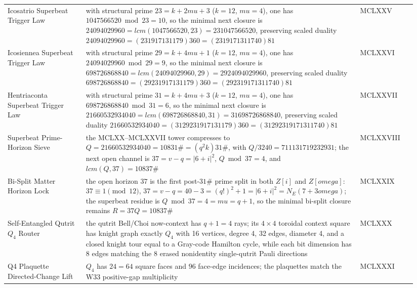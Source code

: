 \documentclass[11pt]{article}
\def\mathbb#1{#1}%
\def\omega{omega}%
\def\mu{mu}%
\def\cdot{ }%
\begin{document}
{\begin{longtable}{>{\raggedright\arraybackslash}p{0.18\linewidth} >{\raggedright\arraybackslash}p{0.63\linewidth} >{\raggedright\arraybackslash}p{0.13\linewidth}}
Icosatrio Superbeat Trigger Law & with structural prime $23=k+2\mu+3$ ($k=12$, $\mu=4$), one has $1047566520\bmod 23=10$, so the minimal next closure is $24094029960=lcm(1047566520,23)=23\cdot1047566520$, preserving scaled duality $24094029960=(23\cdot19\cdot17\cdot13\cdot11\cdot7\cdot9)\cdot360=(23\cdot19\cdot17\cdot13\cdot11\cdot7\cdot40)\cdot81$ & MCLXXV \\
Icosiennea Superbeat Trigger Law & with structural prime $29=k+4\mu+1$ ($k=12$, $\mu=4$), one has $24094029960\bmod 29=9$, so the minimal next closure is $698726868840=lcm(24094029960,29)=29\cdot24094029960$, preserving scaled duality $698726868840=(29\cdot23\cdot19\cdot17\cdot13\cdot11\cdot7\cdot9)\cdot360=(29\cdot23\cdot19\cdot17\cdot13\cdot11\cdot7\cdot40)\cdot81$ & MCLXXVI \\
Hentriaconta Superbeat Trigger Law & with structural prime $31=k+4\mu+3$ ($k=12$, $\mu=4$), one has $698726868840\bmod 31=6$, so the minimal next closure is $21660532934040=lcm(698726868840,31)=31\cdot698726868840$, preserving scaled duality $21660532934040=(31\cdot29\cdot23\cdot19\cdot17\cdot13\cdot11\cdot7\cdot9)\cdot360=(31\cdot29\cdot23\cdot19\cdot17\cdot13\cdot11\cdot7\cdot40)\cdot81$ & MCLXXVII \\
Superbeat Prime-Horizon Sieve & the MCLXX--MCLXXVII tower compresses to $Q=21660532934040=108\cdot31\#=(q^2k)\cdot31\#$, with $Q/3240=7\cdot11\cdot13\cdot17\cdot19\cdot23\cdot29\cdot31$; the next open channel is $37=v-q=|6+i|^2$, $Q\bmod37=4$, and $lcm(Q,37)=108\cdot37\#$ & MCLXXVIII \\
37 Bi-Split Matter Horizon Lock & the open horizon $37$ is the first post-$31\#$ prime split in both $\mathbb Z[i]$ and $\mathbb Z[\omega]$: $37\equiv1\pmod{12}$, $37=v-q=40-3=(q!)^2+1=|6+i|^2=N_E(7+3\omega)$; the superbeat residue is $Q\bmod37=4=\mu=q+1$, so the minimal bi-split closure remains $R=37Q=108\cdot37\#$ & MCLXXIX \\
Self-Entangled Qutrit $Q_4$ Router & the qutrit Bell/Choi now-context has $q+1=4$ rays; its $4\times4$ toroidal context square has knight graph exactly $Q_4$ with 16 vertices, degree 4, 32 edges, diameter 4, and a closed knight tour equal to a Gray-code Hamilton cycle, while each bit dimension has 8 edges matching the 8 erased nonidentity single-qutrit Pauli directions & MCLXXX \\
Q4 Plaquette Directed-Change Lift & $Q_4$ has $24=6\cdot4$ square faces and $96$ face-edge incidences; the plaquettes match the W33 positive-gap multiplicity & MCLXXXI \\

\end{longtable}}
\end{document}
